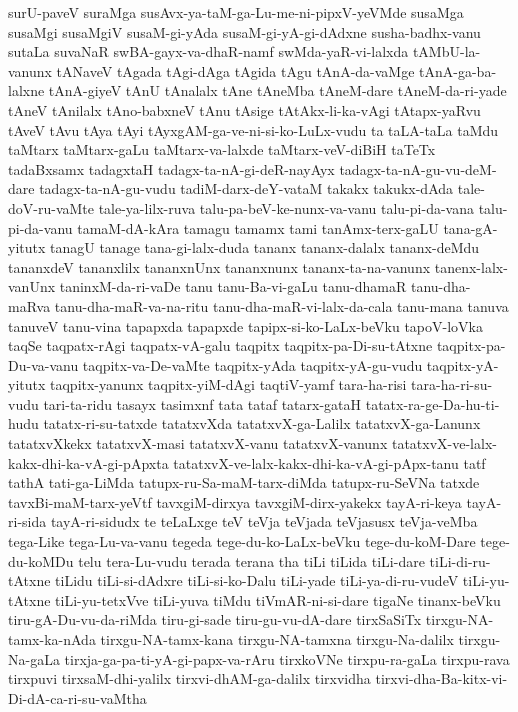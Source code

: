 {surU-paveV
suraMga
susAvx-ya-taM-ga-Lu-me-ni-pipxV-yeVMde
susaMga
susaMgi
susaMgiV
susaM-gi-yAda
susaM-gi-yA-gi-dAdxne
susha-badhx-vanu
sutaLa
suvaNaR
swBA-gayx-va-dhaR-namf
swMda-yaR-vi-lalxda
tAMbU-la-vanunx
tANaveV
tAgada
tAgi-dAga
tAgida
tAgu
tAnA-da-vaMge
tAnA-ga-ba-lalxne
tAnA-giyeV
tAnU
tAnalalx
tAne
tAneMba
tAneM-dare
tAneM-da-ri-yade
tAneV
tAnilalx
tAno-babxneV
tAnu
tAsige
tAtAkx-li-ka-vAgi
tAtapx-yaRvu
tAveV
tAvu
tAya
tAyi
tAyxgAM-ga-ve-ni-si-ko-LuLx-vudu
ta
taLA-taLa
taMdu
taMtarx
taMtarx-gaLu
taMtarx-va-lalxde
taMtarx-veV-diBiH
taTeTx
tadaBxsamx
tadagxtaH
tadagx-ta-nA-gi-deR-nayAyx
tadagx-ta-nA-gu-vu-deM-dare
tadagx-ta-nA-gu-vudu
tadiM-darx-deY-vataM
takakx
takukx-dAda
tale-doV-ru-vaMte
tale-ya-lilx-ruva
talu-pa-beV-ke-nunx-va-vanu
talu-pi-da-vana
talu-pi-da-vanu
tamaM-dA-kAra
tamagu
tamamx
tami
tanAmx-terx-gaLU
tana-gA-yitutx
tanagU
tanage
tana-gi-lalx-duda
tananx
tananx-dalalx
tananx-deMdu
tananxdeV
tananxlilx
tananxnUnx
tananxnunx
tananx-ta-na-vanunx
tanenx-lalx-vanUnx
taninxM-da-ri-vaDe
tanu
tanu-Ba-vi-gaLu
tanu-dhamaR
tanu-dha-maRva
tanu-dha-maR-va-na-ritu
tanu-dha-maR-vi-lalx-da-cala
tanu-mana
tanuva
tanuveV
tanu-vina
tapapxda
tapapxde
tapipx-si-ko-LaLx-beVku
tapoV-loVka
taqSe
taqpatx-rAgi
taqpatx-vA-galu
taqpitx
taqpitx-pa-Di-su-tAtxne
taqpitx-pa-Du-va-vanu
taqpitx-va-De-vaMte
taqpitx-yAda
taqpitx-yA-gu-vudu
taqpitx-yA-yitutx
taqpitx-yanunx
taqpitx-yiM-dAgi
taqtiV-yamf
tara-ha-risi
tara-ha-ri-su-vudu
tari-ta-ridu
tasayx
tasimxnf
tata
tataf
tatarx-gataH
tatatx-ra-ge-Da-hu-ti-hudu
tatatx-ri-su-tatxde
tatatxvXda
tatatxvX-ga-Lalilx
tatatxvX-ga-Lanunx
tatatxvXkekx
tatatxvX-masi
tatatxvX-vanu
tatatxvX-vanunx
tatatxvX-ve-lalx-kakx-dhi-ka-vA-gi-pApxta
tatatxvX-ve-lalx-kakx-dhi-ka-vA-gi-pApx-tanu
tatf
tathA
tati-ga-LiMda
tatupx-ru-Sa-maM-tarx-diMda
tatupx-ru-SeVNa
tatxde
tavxBi-maM-tarx-yeVtf
tavxgiM-dirxya
tavxgiM-dirx-yakekx
tayA-ri-keya
tayA-ri-sida
tayA-ri-sidudx
te
teLaLxge
teV
teVja
teVjada
teVjasusx
teVja-veMba
tega-Like
tega-Lu-va-vanu
tegeda
tege-du-ko-LaLx-beVku
tege-du-koM-Dare
tege-du-koMDu
telu
tera-Lu-vudu
terada
terana
tha
tiLi
tiLida
tiLi-dare
tiLi-di-ru-tAtxne
tiLidu
tiLi-si-dAdxre
tiLi-si-ko-Dalu
tiLi-yade
tiLi-ya-di-ru-vudeV
tiLi-yu-tAtxne
tiLi-yu-tetxVve
tiLi-yuva
tiMdu
tiVmAR-ni-si-dare
tigaNe
tinanx-beVku
tiru-gA-Du-vu-da-riMda
tiru-gi-sade
tiru-gu-vu-dA-dare
tirxSaSiTx
tirxgu-NA-tamx-ka-nAda
tirxgu-NA-tamx-kana
tirxgu-NA-tamxna
tirxgu-Na-dalilx
tirxgu-Na-gaLa
tirxja-ga-pa-ti-yA-gi-papx-va-rAru
tirxkoVNe
tirxpu-ra-gaLa
tirxpu-rava
tirxpuvi
tirxsaM-dhi-yalilx
tirxvi-dhAM-ga-dalilx
tirxvidha
tirxvi-dha-Ba-kitx-vi-Di-dA-ca-ri-su-vaMtha
}
